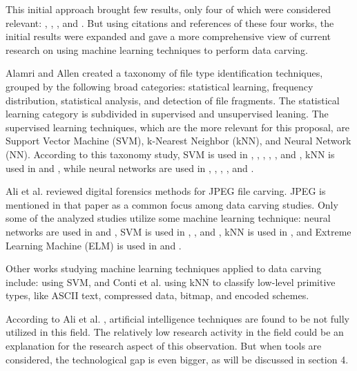 This initial approach brought few results, only four of which were considered relevant: \cite{alamri_taxonomy_2014}, 
\cite{ali_review_2018}, \cite{sportiello_context-based_2012}, and \cite{beebe_sceadan:_2013}. But using citations and references of these four works, the initial results were expanded and gave a more comprehensive view of current research on using machine learning techniques to perform data carving.

Alamri and Allen \cite{alamri_taxonomy_2014} created a taxonomy of file type identification techniques, grouped by the following broad categories: statistical learning, frequency distribution, statistical analysis, and detection of file fragments. The statistical learning category is subdivided in supervised and unsupervised leaning. The supervised learning techniques, which are the more relevant for this proposal, are Support Vector Machine (SVM), k-Nearest Neighbor (kNN), and Neural Network (NN). According to this taxonomy study, SVM is used in \cite{ahmed_fast_2011}, \cite{amirani_feature-based_2013}, \cite{beebe_sceadan:_2013}, \cite{fitzgerald_using_2012}, \cite{gopal_statistical_2011}, and \cite{sportiello_context-based_2012}, kNN is used in \cite{ahmed_fast_2011} and \cite{gopal_statistical_2011}, while neural networks are used in \cite{ahmed_fast_2011}, \cite{ahmed_content-based_2010}, \cite{amirani_new_2008}, \cite{amirani_feature-based_2013}, and \cite{penrose_approaches_2013}.

Ali et al. \cite{ali_review_2018} reviewed digital forensics methods for JPEG file carving. JPEG is mentioned in that paper as a common focus among data carving studies. Only some of the analyzed studies utilize some machine learning technique:
neural networks are used in \cite{xu_reassembling_2009} and \cite{amirani_feature-based_2013},
SVM is used in \cite{qiu_new_2014}, \cite{zhang_svm_2016}, and \cite{sportiello_file_2011},
kNN is used in \cite{axelsson_normalised_2010},
and Extreme Learning Machine (ELM) is used in \cite{zhang_svm_2016} and \cite{ali_classification_2018}.


Other works studying machine learning techniques applied to data carving include: \cite{luigi_file_2011} using SVM,
and Conti et al. \cite{conti_automated_2010} using kNN to classify low-level primitive types, like ASCII text, compressed data, bitmap, and encoded schemes.

According to Ali et al. \cite{ali_review_2018}, artificial intelligence techniques are found to be not fully utilized in this field. The relatively low research activity in the field could be an explanation for the research aspect of this observation. But when tools are considered, the technological gap is even bigger, as will be discussed in section 4.

